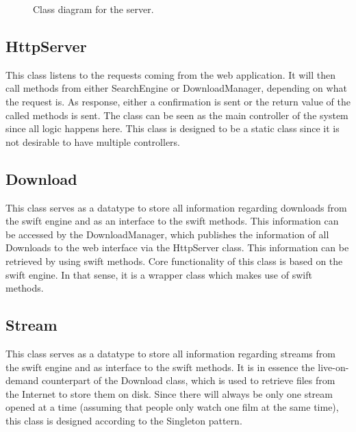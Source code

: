 \begin{center}
\begin{figure}[h!]
\label{fig:class_server}
\caption{Class diagram for the server.}
\end{figure}
\end{center}
\clearpage

\subsection{HttpServer}
This class listens to the requests coming from the web application.
It will then call methods from either SearchEngine or DownloadManager, depending on what the request is. As response, either a confirmation
is sent or the return value of the called methods is sent. The class can be seen as the main controller of the system
since all logic happens here. This class is designed to be a static class since it is not desirable to have multiple controllers.

\subsection{Download}
This class serves as a datatype to store all information regarding downloads from the swift engine and as an interface to the swift methods.
This information can be accessed by the DownloadManager, which publishes the information of all Downloads to the web interface via
the HttpServer class. This information can be retrieved by using swift methods. Core functionality of this class is based on the swift engine.
In that sense, it is a wrapper class which makes use of swift methods.

\subsection{Stream}
This class serves as a datatype to store all information regarding streams from the swift engine and as interface to the swift methods. It is in
essence the live-on-demand counterpart of the Download class, which is used to retrieve files from the Internet to store them on disk.
Since there will always be only one stream opened at a time (assuming that people only watch one film at the same time),
this class is designed according to the Singleton pattern.

